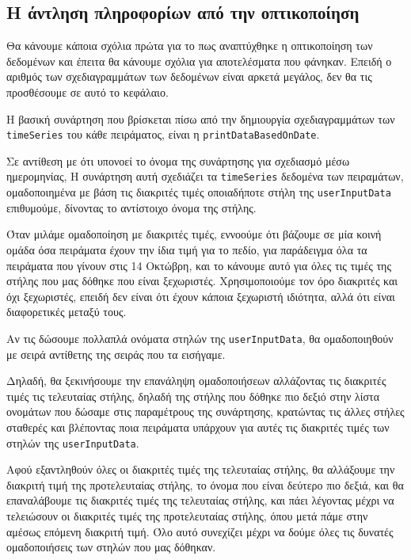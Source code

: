 

\subsection{Η άντληση πληροφορίων από την οπτικοποίηση}

Θα κάνουμε κάποια σχόλια πρώτα για το πως αναπτύχθηκε η οπτικοποίηση των δεδομένων και έπειτα
θα κάνουμε σχόλια για αποτελέσματα που φάνηκαν.
Επειδή ο αριθμός των σχεδιαγραμμάτων των δεδομένων είναι αρκετά μεγάλος, δεν θα τις προσθέσουμε σε αυτό το κεφάλαιο.

Η βασική συνάρτηση που βρίσκεται πίσω από την δημιουργία σχεδιαγραμμάτων των 
\texttt{timeSeries} του κάθε πειράματος,
είναι η \texttt{printDataBasedOnDate}.

Σε αντίθεση με ότι υπονοεί το όνομα της συνάρτησης για σχεδιασμό μέσω ημερομηνίας,
Η συνάρτηση αυτή σχεδιάζει τα \texttt{timeSeries} δεδομένα των πειραμάτων, ομαδοποιημένα με βάση
τις διακριτές τιμές οποιαδήποτε στήλη της \texttt{userInputData} επιθυμούμε, δίνοντας το αντίστοιχο όνομα της στήλης.

Όταν μιλάμε ομαδοποίηση με διακριτές τιμές, εννοούμε ότι βάζουμε σε μία κοινή ομάδα όσα 
πειράματα έχουν την ίδια τιμή για το πεδίο, για παράδειγμα όλα τα πειράματα που γίνουν στις
14 Οκτώβρη, και το κάνουμε αυτό για όλες τις τιμές της στήλης που μας δόθηκε που είναι ξεχωριστές.
Χρησιμοποιούμε τον όρο διακριτές και όχι ξεχωριστές, επειδή δεν είναι ότι έχουν κάποια ξεχωριστή 
ιδιότητα, αλλά ότι είναι διαφορετικές μεταξύ τους.

Αν τις δώσουμε πολλαπλά ονόματα στηλών της \texttt{userInputData},
θα ομαδοποιηθούν με σειρά αντίθετης της σειράς που τα εισήγαμε.

Δηλαδή, θα ξεκινήσουμε την επανάληψη ομαδοποιήσεων αλλάζοντας τις διακριτές τιμές τις τελευταίας στήλης,
δηλαδή της στήλης που δόθηκε πιο δεξιό στην λίστα ονομάτων που δώσαμε στις παραμέτρους της συνάρτησης,
κρατώντας τις άλλες στήλες σταθερές και βλέποντας ποια πειράματα υπάρχουν για αυτές τις διακριτές τιμές
των στηλών της \texttt{userInputData}.

Αφού εξαντληθούν όλες οι διακριτές τιμές της τελευταίας στήλης,
θα αλλάξουμε την διακριτή τιμή της προτελευταίας στήλης, το όνομα που είναι δεύτερο πιο δεξιά, και θα επαναλάβουμε τις διακριτές τιμές της τελευταίας στήλης,
και πάει λέγοντας μέχρι να τελειώσουν οι διακριτές τιμές της προτελευταίας στήλης, όπου μετά πάμε στην αμέσως επόμενη διακριτή τιμή.
Όλο αυτό συνεχίζει μέχρι να δούμε όλες τις δυνατές ομαδοποιήσεις των στηλών που μας δόθηκαν.

